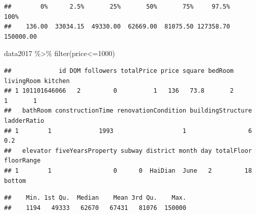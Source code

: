 \documentclass[
]{article}
\newenvironment{Shaded}{\begin{snugshade}}{\end{snugshade}}
\newcommand{\DecValTok}[1]{\textcolor[rgb]{0.00,0.00,0.81}{#1}}
\newcommand{\FloatTok}[1]{\textcolor[rgb]{0.00,0.00,0.81}{#1}}
\newcommand{\FunctionTok}[1]{\textcolor[rgb]{0.00,0.00,0.00}{#1}}
\newcommand{\NormalTok}[1]{#1}
\newcommand{\OtherTok}[1]{\textcolor[rgb]{0.56,0.35,0.01}{#1}}
\newcommand{\SpecialCharTok}[1]{\textcolor[rgb]{0.00,0.00,0.00}{#1}}
\begin{document}
\begin{Shaded}
\end{Shaded}

\begin{verbatim}
##        0%      2.5%       25%       50%       75%     97.5%      100% 
##    136.00  33034.15  49330.00  62669.00  81075.50 127358.70 150000.00
\end{verbatim}

\begin{Shaded}
\begin{Highlighting}[]
\NormalTok{data2017 }\SpecialCharTok{\%\textgreater{}\%}
  \FunctionTok{filter}\NormalTok{(price}\SpecialCharTok{\textless{}=}\DecValTok{1000}\NormalTok{) }
\end{Highlighting}
\end{Shaded}

\begin{verbatim}
##             id DOM followers totalPrice price square bedRoom livingRoom kitchen
## 1 101101646066   2         0          1   136   73.8       2          1       1
##   bathRoom constructionTime renovationCondition buildingStructure ladderRatio
## 1        1             1993                   1                 6         0.2
##   elevator fiveYearsProperty subway district month day totalFloor floorRange
## 1        1                 0      0  HaiDian  June   2         18     bottom
\end{verbatim}

\begin{Shaded}
\end{Shaded}

\begin{verbatim}
##    Min. 1st Qu.  Median    Mean 3rd Qu.    Max. 
##    1194   49333   62670   67431   81076  150000
\end{verbatim}
\end{document}
